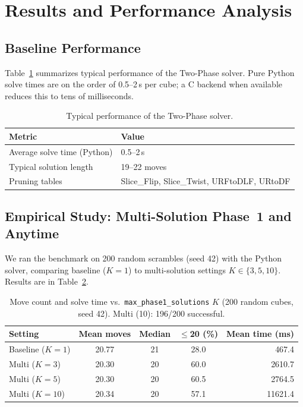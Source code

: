 \documentclass[10pt,twocolumn,a4paper]{article}
\begin{document}
\section{Results and Performance Analysis}
\label{sec:results}

\subsection{Baseline Performance}
Table~\ref{tab:baseline} summarizes typical performance of the Two-Phase solver. Pure Python solve times are on the order of 0.5--2\,s per cube; a C backend when available reduces this to tens of milliseconds.

\begin{table}[t]
\centering
\caption{Typical performance of the Two-Phase solver.}
\label{tab:baseline}
\begin{tabular}{@{}ll@{}}
\toprule
\textbf{Metric} & \textbf{Value} \\
\midrule
Average solve time (Python) & 0.5--2\,s \\
Typical solution length & 19--22 moves \\
Pruning tables & Slice\_Flip, Slice\_Twist, URFtoDLF, URtoDF \\
\bottomrule
\end{tabular}
\end{table}

\subsection{Empirical Study: Multi-Solution Phase~1 and Anytime}
We ran the benchmark on 200 random scrambles (seed 42) with the Python solver, comparing baseline ($K=1$) to multi-solution settings $K \in \{3, 5, 10\}$. Results are in Table~\ref{tab:benchmark}.

\begin{table}[t]
\centering
\caption{Move count and solve time vs.\ \texttt{max\_phase1\_solutions} $K$ (200 random cubes, seed 42). Multi (10): 196/200 successful.}
\label{tab:benchmark}
\begin{tabular}{@{}lcccr@{}}
\toprule
\textbf{Setting} & \textbf{Mean moves} & \textbf{Median} & \textbf{$\leq$20 (\%)} & \textbf{Mean time (ms)} \\
\midrule
Baseline ($K=1$)  & 20.77 & 21 & 28.0 & 467.4 \\
Multi ($K=3$)     & 20.30 & 20 & 60.0 & 2610.7 \\
Multi ($K=5$)     & 20.30 & 20 & 60.5 & 2764.5 \\
Multi ($K=10$)   & 20.34 & 20 & 57.1 & 11621.4 \\
\bottomrule
\end{tabular}
\end{table}
\end{document}
